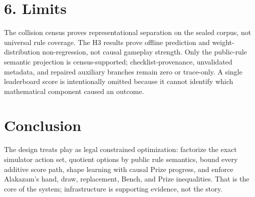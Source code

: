 \section*{6. Limits}

The collision census proves representational separation on the sealed corpus,
not universal rule coverage. The H3 results prove offline prediction and
weight-distribution non-regression, not causal gameplay strength. Only the
public-rule semantic projection is census-supported; checklist-provenance,
unvalidated metadata, and repaired auxiliary branches remain zero or
trace-only. A single leaderboard score is intentionally omitted because it
cannot identify which mathematical component caused an outcome.

\section*{Conclusion}

The design treats play as legal constrained optimization: factorize the exact
simulator action set, quotient options by public rule semantics, bound every
additive score path, shape learning with causal Prize progress, and enforce
Alakazam's hand, draw, replacement, Bench, and Prize inequalities. That is the
core of the system; infrastructure is supporting evidence, not the story.
